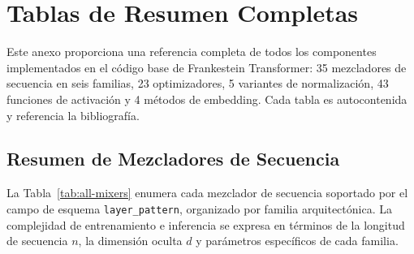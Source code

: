 \section{Tablas de Resumen Completas}
\label{sec:annex-summary-tables}

Este anexo proporciona una referencia completa de todos los componentes implementados en el código base de Frankestein Transformer: 35 mezcladores de secuencia en seis familias, 23 optimizadores, 5 variantes de normalización, 43 funciones de activación y 4 métodos de embedding. Cada tabla es autocontenida y referencia la bibliografía.

\subsection{Resumen de Mezcladores de Secuencia}

La Tabla~\ref{tab:all-mixers} enumera cada mezclador de secuencia soportado por el campo de esquema \texttt{layer\_pattern}, organizado por familia arquitectónica. La complejidad de entrenamiento e inferencia se expresa en términos de la longitud de secuencia $n$, la dimensión oculta $d$ y parámetros específicos de cada familia.

